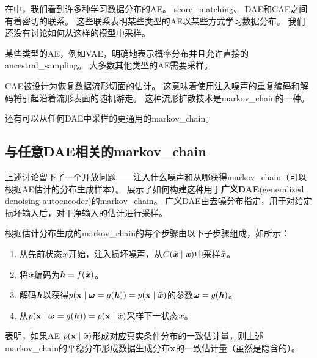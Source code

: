 在中，我们看到许多种学习数据分布的\gls{AE}。
\gls{score_matching}、 \gls{DAE}和\gls{CAE}之间有着密切的联系。
这些联系表明某些类型的\gls{AE}以某些方式学习数据分布。
我们还没有讨论如何从这样的模型中采样。


某些类型的\gls{AE}，例如\gls{VAE}，明确地表示概率分布并且允许直接的\gls{ancestral_sampling}。
大多数其他类型的\gls{AE}需要采样。

\gls{CAE}被设计为恢复数据流形切面的估计。
这意味着使用注入噪声的重复编码和解码将引起沿着流形表面的随机游走\citep{Rifai-icml2012-small,Mesnil-et-al-LW2012}。
这种流形扩散技术是\gls{markov_chain}的一种。

还有可以从任何\gls{DAE}中采样的更通用的\gls{markov_chain}。


\subsection{与任意\gls{DAE}相关的\gls{markov_chain}}
\label{sec:markov_chain_associated_with_any_denoising_autoencoder}

上述讨论留下了一个开放问题——注入什么噪声和从哪获得\gls{markov_chain}（可以根据\gls{AE}估计的分布生成样本）。
\citet{Bengio-et-al-NIPS2013-small} 展示了如何构建这种用于\textbf{广义\gls{DAE}}(generalized denoising autoencoder)的\gls{markov_chain}。
广义\gls{DAE}由去噪分布指定，用于对给定损坏输入后，对干净输入的估计进行采样。

根据估计分布生成的\gls{markov_chain}的每个步骤由以下子步骤组成，如所示：
\begin{enumerate}
 \item 从先前状态$\boldsymbol{\mathit{x}}$开始，注入损坏噪声，从$C(\tilde{\boldsymbol{\mathit{x}}}  \mid  \boldsymbol{\mathit{x}})$中采样$\tilde{\boldsymbol{\mathit{x}}}$。
 \item 将$\tilde{\boldsymbol{\mathit{x}}}$编码为$\boldsymbol{\mathit{h}} = f(\tilde{\boldsymbol{\mathit{x}}})$。
 \item 解码$\boldsymbol{\mathit{h}}$以获得$p(\mathbf{x}  \mid  \boldsymbol{\omega} = g(\boldsymbol{\mathit{h}})) = p(\mathbf{x}  \mid  \tilde{\boldsymbol{\mathit{x}}})$的参数$\boldsymbol{\omega} = g(\boldsymbol{\mathit{h}})$。
 \item 从$p(\mathbf{x}  \mid  \boldsymbol{\omega} = g(\boldsymbol{\mathit{h}})) = p(\mathbf{x}  \mid  \tilde{\boldsymbol{\mathit{x}}})$采样下一状态$\boldsymbol{\mathit{x}}$。
\end{enumerate}
\citet{Bengio-et-al-ICML-2014}表明，如果\gls{AE} $p(\mathbf{x}  \mid  \tilde{\boldsymbol{\mathit{x}}})$形成对应真实条件分布的一致估计量，则上述\gls{markov_chain}的平稳分布形成数据生成分布$\mathbf{x}$的一致估计量（虽然是隐含的）。

